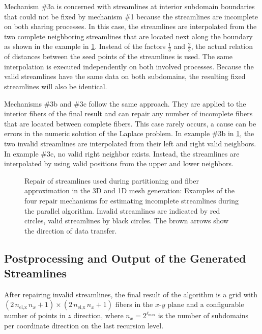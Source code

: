 Mechanism \#3a is concerned with streamlines at interior subdomain boundaries that could not be fixed by mechanism \#1 because the streamlines are incomplete on both sharing processes. In this case, the streamlines are interpolated from the two complete neighboring streamlines that are located next along the boundary as shown in the example in \cref{fig:fix_invalid}. Instead of the factors $\frac13$ and $\frac23$, the actual relation of distances between the seed points of the streamlines is used. The same interpolation is executed independently on both involved processes. Because the valid streamlines have the same data on both subdomains, the resulting fixed streamlines will also be identical.

Mechanisms \#3b and \#3c follow the same approach. They are applied to the interior fibers of the final result and can repair any number of incomplete fibers that are located between complete fibers. This case rarely occurs, a cause can be errors in the numeric solution of the Laplace problem.  In example \#3b in \cref{fig:fix_invalid}, the two invalid streamlines are interpolated from their left and right valid neighbors. In example \#3c, no valid right neighbor exists. Instead, the streamlines are interpolated by using valid positions from the upper and lower neighbors.

\begin{figure}%
  \centering%
  \def\svgwidth{0.8\textwidth}
  
  \caption{Repair of streamlines used during partitioning and fiber approximation in the 3D and 1D mesh generation: Examples of the four repair mechanisms for estimating incomplete streamlines during the parallel algorithm. Invalid streamlines are indicated by red circles, valid streamlines by black circles. The brown arrows show the direction of data transfer.}%
  \label{fig:fix_invalid}%
\end{figure}%

\subsection{Postprocessing and Output of the Generated Streamlines}\label{sec:postprocessing_of_the_generated_streamlines}

After repairing invalid streamlines, the final result of the algorithm is a grid with $(2\,n_\text{el,x}\,n_x+1) \times (2\,n_\text{el,x}\,n_x+1)$ fibers in the $x$-$y$ plane and a configurable number of points in $z$ direction, where $n_x = 2^{\ell_\text{max}}$ is the number of subdomains per coordinate direction on the last recursion level. 

